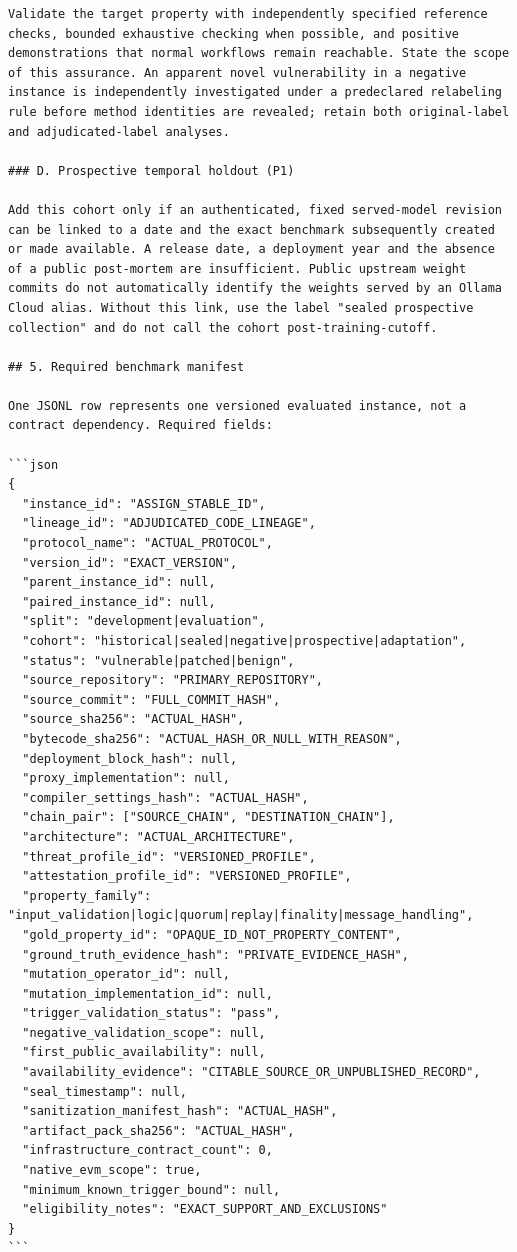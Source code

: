 \documentclass[11pt,a4paper]{article}
\begin{document}
\begin{verbatim}
Validate the target property with independently specified reference checks, bounded exhaustive checking when possible, and positive demonstrations that normal workflows remain reachable. State the scope of this assurance. An apparent novel vulnerability in a negative instance is independently investigated under a predeclared relabeling rule before method identities are revealed; retain both original-label and adjudicated-label analyses.

### D. Prospective temporal holdout (P1)

Add this cohort only if an authenticated, fixed served-model revision can be linked to a date and the exact benchmark subsequently created or made available. A release date, a deployment year and the absence of a public post-mortem are insufficient. Public upstream weight commits do not automatically identify the weights served by an Ollama Cloud alias. Without this link, use the label "sealed prospective collection" and do not call the cohort post-training-cutoff.

## 5. Required benchmark manifest

One JSONL row represents one versioned evaluated instance, not a contract dependency. Required fields:

```json
{
  "instance_id": "ASSIGN_STABLE_ID",
  "lineage_id": "ADJUDICATED_CODE_LINEAGE",
  "protocol_name": "ACTUAL_PROTOCOL",
  "version_id": "EXACT_VERSION",
  "parent_instance_id": null,
  "paired_instance_id": null,
  "split": "development|evaluation",
  "cohort": "historical|sealed|negative|prospective|adaptation",
  "status": "vulnerable|patched|benign",
  "source_repository": "PRIMARY_REPOSITORY",
  "source_commit": "FULL_COMMIT_HASH",
  "source_sha256": "ACTUAL_HASH",
  "bytecode_sha256": "ACTUAL_HASH_OR_NULL_WITH_REASON",
  "deployment_block_hash": null,
  "proxy_implementation": null,
  "compiler_settings_hash": "ACTUAL_HASH",
  "chain_pair": ["SOURCE_CHAIN", "DESTINATION_CHAIN"],
  "architecture": "ACTUAL_ARCHITECTURE",
  "threat_profile_id": "VERSIONED_PROFILE",
  "attestation_profile_id": "VERSIONED_PROFILE",
  "property_family": "input_validation|logic|quorum|replay|finality|message_handling",
  "gold_property_id": "OPAQUE_ID_NOT_PROPERTY_CONTENT",
  "ground_truth_evidence_hash": "PRIVATE_EVIDENCE_HASH",
  "mutation_operator_id": null,
  "mutation_implementation_id": null,
  "trigger_validation_status": "pass",
  "negative_validation_scope": null,
  "first_public_availability": null,
  "availability_evidence": "CITABLE_SOURCE_OR_UNPUBLISHED_RECORD",
  "seal_timestamp": null,
  "sanitization_manifest_hash": "ACTUAL_HASH",
  "artifact_pack_sha256": "ACTUAL_HASH",
  "infrastructure_contract_count": 0,
  "native_evm_scope": true,
  "minimum_known_trigger_bound": null,
  "eligibility_notes": "EXACT_SUPPORT_AND_EXCLUSIONS"
}
```


\end{verbatim}
\end{document}
